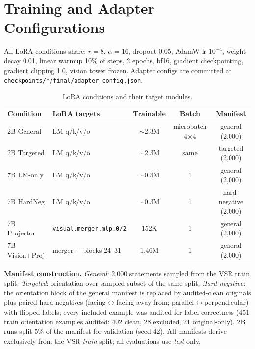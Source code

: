 \section{Training and Adapter Configurations}
\label{app:training}

All LoRA conditions share: $r{=}8$, $\alpha{=}16$, dropout 0.05, AdamW
lr $10^{-4}$, weight decay 0.01, linear warmup 10\% of steps, 2 epochs,
bf16, gradient checkpointing, gradient clipping 1.0, vision tower frozen.
Adapter configs are committed at \texttt{checkpoints/*/final/adapter\_config.json}.

\begin{table}[h]
\centering
\footnotesize
\setlength{\tabcolsep}{4pt}
\begin{tabular}{llccc}
\toprule
Condition & LoRA targets & Trainable & Batch & Manifest \\
\midrule
2B General & LM q/k/v/o & $\sim$2.3M & microbatch 4$\times$4 & general (2{,}000) \\
2B Targeted & LM q/k/v/o & $\sim$2.3M & same & targeted (2{,}000) \\
7B LM-only & LM q/k/v/o & $\sim$0.3M & 1 & general (2{,}000) \\
7B HardNeg & LM q/k/v/o & $\sim$0.3M & 1 & hard-negative (2{,}000) \\
7B Projector & \texttt{visual.merger.mlp.0/2} & 152K & 1 & general (2{,}000) \\
7B Vision+Proj & merger + blocks 24--31 & 1.46M & 1 & general (2{,}000) \\
\bottomrule
\end{tabular}
\caption{LoRA conditions and their target modules.}
\label{tab:adapters}
\end{table}

\textbf{Manifest construction.} \emph{General}: 2{,}000 statements sampled from
the VSR train split. \emph{Targeted}: orientation-over-sampled subset of the
same split. \emph{Hard-negative}: the orientation block of the general manifest
is replaced by audited-clean originals plus paired hard negatives
(facing$\leftrightarrow$facing away from; parallel$\leftrightarrow$perpendicular)
with flipped labels; every included example was audited for label correctness
(451 train orientation examples audited: 402 clean, 28 excluded, 21 original-only). 2B runs split
5\% of the manifest for validation (seed 42). All manifests derive exclusively
from the VSR \emph{train} split; all evaluations use \emph{test} only.

